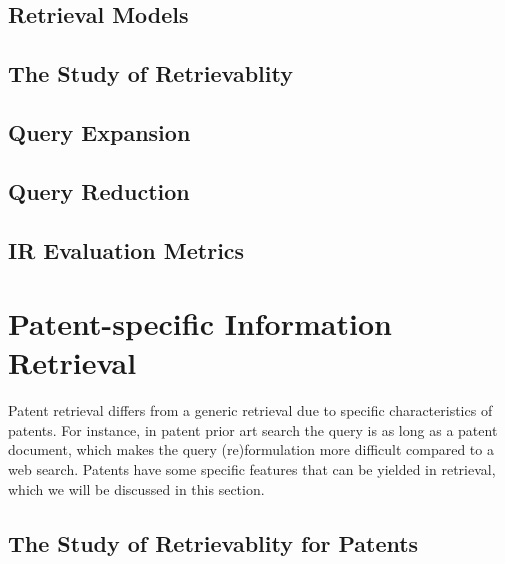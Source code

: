 \subsection{Retrieval Models}
\label{subsub:retmodels}


\subsection{The Study of Retrievablity}

\label{subsub:retrievability}

\subsection{Query Expansion}


\subsection{Query Reduction}

%

\subsection{IR Evaluation Metrics}



\section{Patent-specific Information Retrieval}
\label{subsec:patentir}
Patent retrieval differs from a generic retrieval due to specific characteristics of patents. 
For instance, in patent prior art search the query is as long as a patent document, which makes 
the query (re)formulation more difficult compared to a web search. Patents have some specific 
features that can be yielded in retrieval, which we will  be discussed in this section.

\subsection{The Study of Retrievablity for Patents}


